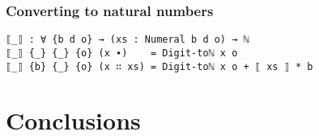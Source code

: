 \documentclass[12pt, a4paper]{article}
\begin{document}
\subsubsection{Converting to natural numbers}

\begin{lstlisting}
⟦_⟧ : ∀ {b d o} → (xs : Numeral b d o) → ℕ
⟦_⟧ {_} {_} {o} (x ∙)    = Digit-toℕ x o
⟦_⟧ {b} {_} {o} (x ∷ xs) = Digit-toℕ x o + ⟦ xs ⟧ * b
\end{lstlisting}


\section{Conclusions}\label{conclusions}



\end{document}
